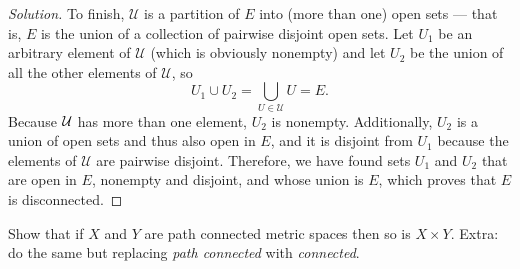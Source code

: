 \documentclass[11pt]{scrartcl}
\newenvironment{soln}{\begin{proof}[Solution]}{\end{proof}}
\begin{document}
\begin{soln}
	To finish, $\mathcal U$ is a partition of $E$
	into (more than one) open sets --- that is, $E$ is the union
	of a collection of pairwise disjoint open sets.
	Let $U_1$ be an arbitrary element of $\mathcal U$
	(which is obviously nonempty)
	and let $U_2$ be the union of all the other elements of $\mathcal U$, so
	\[U_1\cup U_2 = \bigcup_{U\in\mathcal U} U = E.\]
	Because $\cal U$ has more than one element, $U_2$ is nonempty.
	Additionally, $U_2$ is a union of open sets and thus also open in $E$,
	and it is disjoint from $U_1$ because the elements of $\mathcal U$
	are pairwise disjoint.
	Therefore, we have found sets $U_1$ and $U_2$ that are open in $E$,
	nonempty and disjoint, and whose union is $E$,
	which proves that $E$ is disconnected.
\end{soln}

\begin{problem}
	Show that if $X$ and $Y$ are path connected metric spaces
	then so is $X\times Y$.
	Extra: do the same but replacing
	\emph{path connected} with \emph{connected}.
\end{problem}
\end{document}
